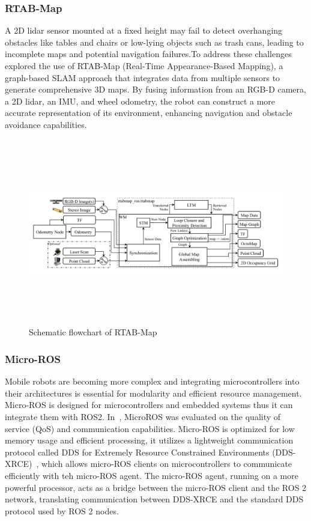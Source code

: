 \subsubsection{RTAB-Map}

A 2D lidar sensor mounted at a fixed height may fail to detect overhanging obstacles like tables and chairs
or low-lying objects such as trash cans, leading to incomplete maps and potential navigation failures.To address these challenges~\cite{labbe2018rtabmap} explored the use of RTAB-Map (Real-Time Appearance-Based Mapping), a graph-based SLAM approach that integrates
data from multiple sensors to generate comprehensive 3D maps. By fusing information from an RGB-D camera, a 2D lidar, an IMU, and wheel odometry, the robot can construct a more accurate representation of its environment, enhancing navigation and obstacle avoidance capabilities.



\vspace{0.7em}
\begin{figure}[H]
    \centering
    \includegraphics[width=6.3in, height=3.2in]{pics/rtab1.png}
    \caption[Schematic flowchart of RTAB-Map]{Schematic flowchart of RTAB-Map~\cite{labbe2018rtabmap}}\label{rtab_flow}
\end{figure}



\subsubsection{Micro-ROS}
Mobile robots are becoming more complex and integrating microcontrollers into their architectures is 
essential for modularity and efficient
resource management. Micro-ROS is designed for microcontrollers and embedded systems thus it can integrate 
them with ROS2. In~\cite{nguyen2022microros}, MicroROS
was evaluated on the quality of service (QoS) and communication capabilities. Micro-ROS is optimized for 
low memory usage and efficient
processing, it utilizes a lightweight communication protocol called DDS for Extremely Resource Constrained 
Environments (DDS-XRCE)~\cite{nguyen2022microros},
which allows micro-ROS clients on microcontrollers to communicate efficiently with teh micro-ROS agent. 
The micro-ROS agent, running on a more powerful processor, acts as a bridge between the micro-ROS client 
and the ROS 2 network, translating communication between DDS-XRCE and the standard DDS protocol used by 
ROS 2 nodes.


